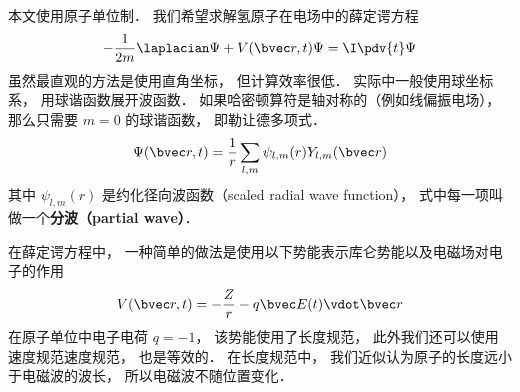 

本文使用原子单位制． 我们希望求解氢原子在电场中的薛定谔方程
\begin{equation}
-\frac{1}{2m}\laplacian \Psi + V(\bvec r, t)\Psi = \I \pdv{t}\Psi
\end{equation}
虽然最直观的方法是使用直角坐标， 但计算效率很低． 实际中一般使用球坐标系， 用球谐函数展开波函数． 如果哈密顿算符是轴对称的（例如线偏振电场）， 那么只需要 $m = 0$ 的球谐函数， 即勒让德多项式．
\begin{equation}\label{HyTDSE_eq3}
\Psi(\bvec r, t) = \frac{1}{r}\sum_{l,m} \psi_{l,m}(r) Y_{l,m}(\bvec r)
\end{equation}
其中 $\psi_{l,m}(r)$ 是约化径向波函数（scaled radial wave function）， 式中每一项叫做一个\textbf{分波（partial wave）}．

在薛定谔方程中， 一种简单的做法是使用以下势能表示库仑势能以及电磁场对电子的作用
\begin{equation}
V(\bvec r, t) = -\frac{Z}{r} - q\bvec E(t) \vdot \bvec r
\end{equation}
在原子单位中电子电荷 $q = -1$， 该势能使用了长度规范， 此外我们还可以使用速度规范速度规范， 也是等效的． 在长度规范中， 我们近似认为原子的长度远小于电磁波的波长， 所以电磁波不随位置变化．

